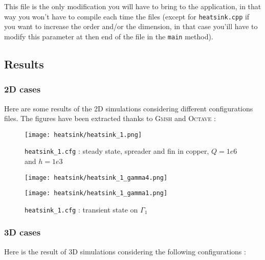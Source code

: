 This file is the only modification you will have to bring to the application, in that way you won't have to compile each time the files (except for \lstinline!heatsink.cpp! if you want to increase the order and/or the dimension, in that case you'ill have to modify this parameter at then end of the file in the \lstinline!main! method).

\subsection{Results}

\subsubsection{2D cases}
Here are some results of the 2D simulations considering different configurations files. The figures have been extracted thanks to \textsc{Gmsh} and \textsc{Octave} :

\begin{figure}[!h]
\centering
\texttt{[image: heatsink/heatsink\_1.png]}
\caption{\lstinline!heatsink_1.cfg! : steady state, spreader and fin in copper, $Q=1e6$ and $h=1e3$}
\end{figure}


\begin{figure}[!h]
\begin{minipage}[b]{.5\linewidth}
\centering
\texttt{[image: heatsink/heatsink\_1\_gamma4.png]}
\caption{\lstinline!heatsink_1.cfg! : transient state on $\Gamma_4$}
\end{minipage}
\begin{minipage}[b]{.5\linewidth}
\centering
\texttt{[image: heatsink/heatsink\_1\_gamma1.png]}
\caption{\lstinline!heatsink_1.cfg! : transient state on $\Gamma_1$}
\end{minipage}
\end{figure}

\clearpage


\subsubsection{3D cases}
Here is the result of 3D simulations considering the following configurations :

